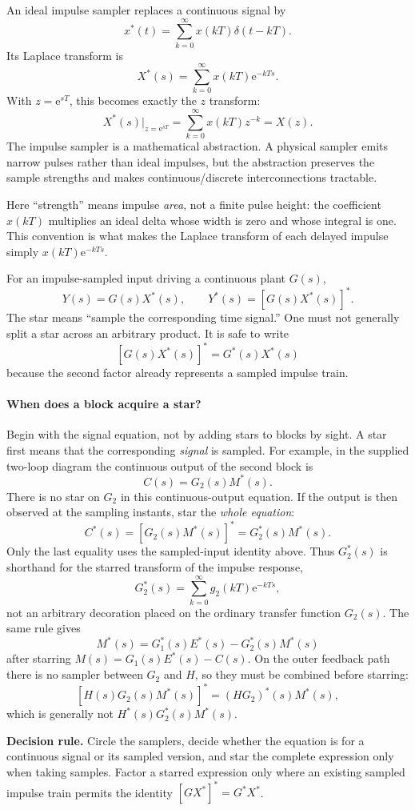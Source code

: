 \documentclass[11pt]{article}
\newcommand{\e}{\mathrm{e}}
\begin{document}
An ideal impulse sampler replaces a continuous signal by
\[
x^*(t)=\sum_{k=0}^{\infty}x(kT)\delta(t-kT).
\]
Its Laplace transform is
\[
X^*(s)=\sum_{k=0}^{\infty}x(kT)\e^{-kTs}.
\]
With $z=\e^{sT}$, this becomes exactly the $z$ transform:
\[
X^*(s)\big|_{z=\e^{sT}}=\sum_{k=0}^{\infty}x(kT)z^{-k}=X(z).
\]
The impulse sampler is a mathematical abstraction. A physical sampler emits narrow pulses rather than ideal impulses, but the abstraction preserves the sample strengths and makes continuous/discrete interconnections tractable.

Here ``strength'' means impulse \emph{area}, not a finite pulse height: the coefficient $x(kT)$ multiplies an ideal delta whose width is zero and whose integral is one. This convention is what makes the Laplace transform of each delayed impulse simply $x(kT)\e^{-kTs}$.

For an impulse-sampled input driving a continuous plant $G(s)$,
\[
Y(s)=G(s)X^*(s),\qquad
Y^*(s)=[G(s)X^*(s)]^*.
\]
The star means ``sample the corresponding time signal.'' One must not generally split a star across an arbitrary product. It is safe to write
\[
[G(s)X^*(s)]^*=G^*(s)X^*(s)
\]
because the second factor already represents a sampled impulse train.

\paragraph{When does a block acquire a star?}
Begin with the signal equation, not by adding stars to blocks by sight.  A star
first means that the corresponding \emph{signal} is sampled.  For example, in
the supplied two-loop diagram the continuous output of the second block is
\[
C(s)=G_2(s)M^*(s).
\]
There is no star on $G_2$ in this continuous-output equation.  If the output is
then observed at the sampling instants, star the \emph{whole equation}:
\[
C^*(s)=[G_2(s)M^*(s)]^*=G_2^*(s)M^*(s).
\]
Only the last equality uses the sampled-input identity above.  Thus
$G_2^*(s)$ is shorthand for the starred transform of the impulse response,
\[
G_2^*(s)=\sum_{k=0}^{\infty}g_2(kT)\e^{-kTs},
\]
not an arbitrary decoration placed on the ordinary transfer function
$G_2(s)$.  The same rule gives
\[
M^*(s)=G_1^*(s)E^*(s)-G_2^*(s)M^*(s)
\]
after starring $M(s)=G_1(s)E^*(s)-C(s)$.  On the outer feedback path there is
no sampler between $G_2$ and $H$, so they must be combined before starring:
\[
[H(s)G_2(s)M^*(s)]^*=(HG_2)^*(s)M^*(s),
\]
which is generally not $H^*(s)G_2^*(s)M^*(s)$.

\textbf{Decision rule.} Circle the samplers, decide whether the equation is for
a continuous signal or its sampled version, and star the complete expression
only when taking samples.  Factor a starred expression only where an existing
sampled impulse train permits the identity $[G X^*]^*=G^*X^*$.
\end{document}
